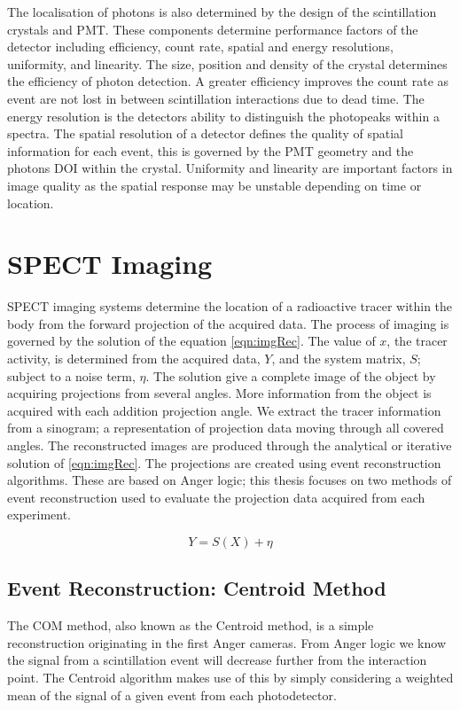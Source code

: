 The localisation of photons is also determined by the design of the scintillation crystals and \acrshort{PMT}. These components determine performance factors of the detector including efficiency, count rate, spatial and energy resolutions, uniformity, and linearity. The size, position and density of the crystal determines the efficiency of photon detection. A greater efficiency improves the count rate as event are not lost in between scintillation interactions due to dead time. The energy resolution is the detectors ability to distinguish the photopeaks within a spectra. The spatial resolution of a detector defines the quality of spatial information for each event, this is governed by the \acrshort{PMT} geometry and the photons \acrlong{DOI} within the crystal. Uniformity and linearity are important factors in image quality as the spatial response may be unstable depending on time or location.

\section{SPECT Imaging} %
\acrshort{SPECT} imaging systems determine the location of a radioactive tracer within the body from the forward projection of the acquired data. The process of imaging is governed by the solution of the equation \ref{eqn:imgRec}. The value of $x$, the tracer activity, is determined from the acquired data, $Y$, and the system matrix, $S$; subject to a noise term, $\eta$. The solution give a complete image of the object by acquiring projections from several angles. More information from the object is acquired with each addition projection angle. We extract the tracer information from a sinogram; a representation of projection data moving through all covered angles. The reconstructed images are produced through the analytical or iterative solution of \ref{eqn:imgRec}. The projections are created using event reconstruction algorithms. These are based on Anger logic; this thesis focuses on two methods of event reconstruction used to evaluate the projection data acquired from each experiment.

\begin{equation} \label{eqn:imgRec}
        Y = S(X) + \eta 
\end{equation}

\subsection{Event Reconstruction: Centroid Method}
The \acrlong{COM} method, also known as the Centroid method, is a simple reconstruction originating in the first Anger cameras. From Anger logic we know the signal from a scintillation event will decrease further from the interaction point. The Centroid algorithm makes use of this by simply considering a weighted mean of the signal of a given event from each photodetector. 

